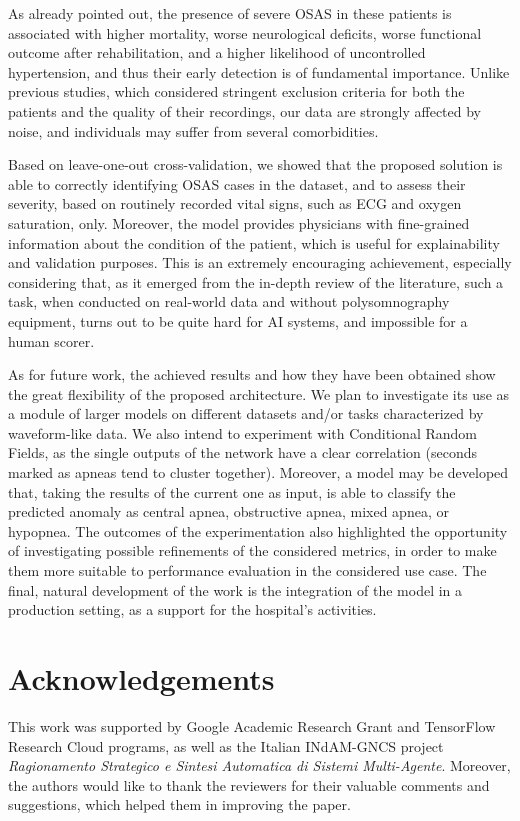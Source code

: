 \documentclass[5p,twocolumn,lefttitle]{elsarticle}
\begin{document}
As already pointed out, the presence of severe OSAS in these patients is associated with higher mortality, worse neurological deficits, worse functional outcome after rehabilitation, and a higher likelihood of uncontrolled hypertension, and thus their early detection is of fundamental importance.
Unlike previous studies, which considered stringent exclusion criteria for both the patients and the quality of their recordings, our data are strongly affected by noise, and individuals may suffer from several comorbidities. 

Based on leave-one-out cross-validation, we showed that the proposed solution is able to correctly identifying OSAS cases in the dataset, and to assess their severity, based on routinely recorded vital signs, such as ECG and oxygen saturation, only. Moreover, the model provides physicians with fine-grained information about the condition of the patient, which is useful for explainability and validation purposes. This is an extremely encouraging achievement, especially considering that, as it emerged from the in-depth review of the literature, such a task, when conducted on real-world data and without polysomnography equipment, turns out to be quite hard for AI systems, and impossible for a human scorer. 



As for future work, the achieved results and how they have been obtained show the great flexibility of the proposed architecture. We plan to investigate its use as a module of larger models on different datasets and/or tasks characterized by waveform-like data.
We also intend to experiment with Conditional Random Fields, as the single outputs of the network have a clear correlation (seconds marked as apneas tend to cluster together).
Moreover, a model may be developed that, taking the results of the current one as input, is able to classify the predicted anomaly as central apnea, obstructive apnea, mixed apnea, or hypopnea.
The outcomes of the experimentation also highlighted the opportunity of investigating  possible refinements of the considered metrics, in order to make them more suitable to performance evaluation in the considered use case.
The final, natural development of the work is the integration of the model in a production setting, as a support for the hospital's activities.


\section*{Acknowledgements}
This work was supported by Google Academic Research Grant and TensorFlow Research Cloud programs, as well as the Italian INdAM-GNCS project \emph{Ragionamento Strategico e Sintesi Automatica di Sistemi Multi-Agente}. Moreover, the authors would like to thank the reviewers for their valuable comments and suggestions, which helped them in improving the paper.


\end{document}
